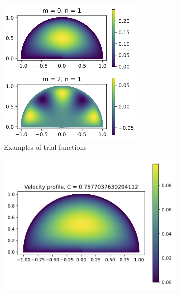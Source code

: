 \documentclass[12pt, a4paper]{article}
\begin{document}
\begin{figure}[hbtp]
  \begin{subfigure}{0.5\textwidth}
  \includegraphics[width=\linewidth]{../graphs/base_functions copy.png}
  \caption{Examples of trial functions} \label{fig:a}
  \end{subfigure}
  \hspace*{\fill}
  \begin{subfigure}{0.5\textwidth}
  \includegraphics[width=\linewidth]{../graphs/velocity_field copy.png}

\end{subfigure}
\end{figure}
\end{document}
